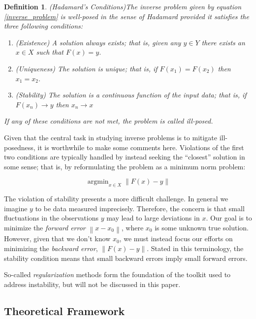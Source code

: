 \documentclass[12pt]{article}
\newcommand*{\norm}[1]{\left\lVert#1\right\rVert}
\DeclareMathOperator*{\argmin}{argmin}
\newtheorem{definition}{Definition}
\begin{document}
\begin{definition} 
(Hadamard's Conditions)The inverse problem given by equation \eqref{inverse_problem} is well-posed in the sense of Hadamard 
provided it satisfies the three following conditions:
\begin{enumerate} 
\item (Existence) A solution always exists; that is, given any $y \in Y$ there exists an $x \in X$ such that $F(x) = y$. 
\item (Uniqueness) The solution is unique; that is, if $F(x_1) = F(x_2)$ then $x_1 = x_2$.
\item (Stability) The solution is a continuous function of the input data; that is, if $F(x_n) \to y$  then $x_n \to x$
\end{enumerate} 
If any of these conditions are not met, the problem is called ill-posed. 
\end{definition} 

Given that the central task in studying inverse problems is to mitigate ill-posedness, it is worthwhile to make some comments here. 
Violations of the first two conditions are typically handled by 
instead seeking the ``closest'' solution in some sense; that is, by reformulating the problem as a minimum norm problem: 

\begin{equation}
\argmin_{x \in X} \norm{F(x) - y} \label{min_norm}
\end{equation}

 The violation of stability presents a more difficult challenge. In general we imagine $y$ to be data measured imprecisely. 
 Therefore, the concern is that small fluctuations in the observations $y$ may lead to large deviations in $x$. 
Our goal is to minimize the \textit{forward error} $\norm{x - x_0}$, where $x_0$ is some unknown true solution. However, 
given that we don't know $x_0$, we must instead focus our efforts on minimizing the \textit{backward error}, $\norm{F(x) - y}$. 
Stated in this terminology, the stability condition means that small backward errors imply small forward errors. 

 So-called \textit{regularization} methods form the foundation of the toolkit used to address instability, but will not be discussed 
 in this paper.  

\subsection{Theoretical Framework}
\end{document}
